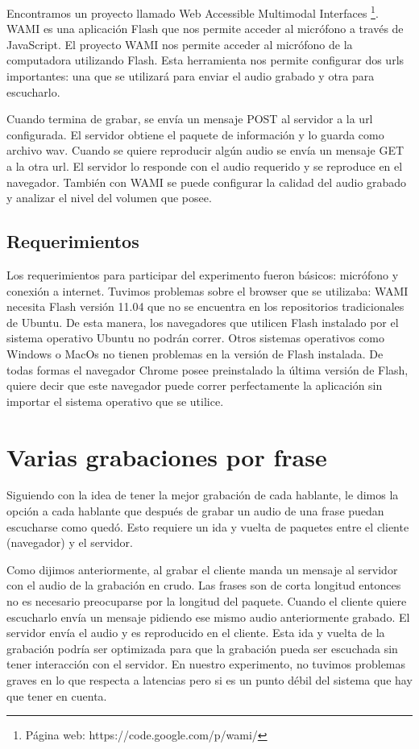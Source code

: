 Encontramos un proyecto llamado Web Accessible Multimodal Interfaces \footnote{Página web: https://code.google.com/p/wami/}. WAMI es una aplicación Flash que nos permite acceder al micrófono a través de JavaScript. El proyecto WAMI nos permite acceder al micrófono de la computadora utilizando Flash. Esta herramienta nos permite configurar dos urls importantes: una que se utilizará para enviar el audio grabado y otra para escucharlo.  

Cuando termina de grabar, se envía un mensaje POST al servidor a la url configurada. El servidor obtiene el paquete de información y lo guarda como archivo wav. Cuando se quiere reproducir algún audio se envía un mensaje GET a la otra url. El servidor lo responde con el audio requerido y se reproduce en el navegador. También con WAMI se puede configurar la calidad del audio grabado y analizar el nivel del volumen que posee. 

\subsection{Requerimientos}

Los requerimientos para participar del experimento fueron básicos: micrófono y conexión a internet. Tuvimos problemas sobre el browser que se utilizaba: WAMI necesita Flash versión 11.04 que no se encuentra en los repositorios tradicionales de Ubuntu. De esta manera, los navegadores que utilicen Flash instalado por el sistema operativo Ubuntu no podrán correr. Otros sistemas operativos como Windows o MacOs no tienen problemas en la versión de Flash instalada. De todas formas el navegador Chrome posee preinstalado la última versión de Flash, quiere decir que este navegador puede correr perfectamente la aplicación sin importar el sistema operativo que se utilice.

\section{Varias grabaciones por frase}

Siguiendo con la idea de tener la mejor grabación de cada hablante, le dimos la opción a cada hablante que después de grabar un audio de una frase puedan escucharse como quedó. Esto requiere un ida y vuelta de paquetes entre el cliente (navegador) y el servidor. 

Como dijimos anteriormente, al grabar el cliente manda un mensaje al servidor con el audio de la grabación en crudo. Las frases son de corta longitud entonces no es necesario preocuparse por la longitud del paquete. Cuando el cliente quiere escucharlo envía un mensaje pidiendo ese mismo audio anteriormente grabado. El servidor envía el audio y es reproducido en el cliente. Esta ida y vuelta de la grabación podría ser optimizada para que la grabación pueda ser escuchada sin tener interacción con el servidor. En nuestro experimento, no tuvimos problemas graves en lo que respecta a latencias pero si es un punto débil del sistema que hay que tener en cuenta.


